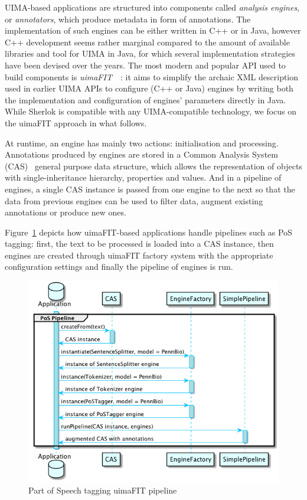\documentclass{article}
\begin{document}
UIMA-based applications are structured into components called \emph{analysis engines}, or
\emph{annotators}, which produce metadata in form of annotations. The implementation of such engines
can be either written in C++ or in Java, however C++ development seems rather marginal compared to
the amount of available libraries and tool for UIMA in Java, for which several implementation
strategies have been devised over the years. The most modern and popular API used to build
components is \emph{uimaFIT}~\cite{uimafit}~\cite{uimafit_2009}: it aims to simplify the archaic XML
description used in earlier UIMA APIs to configure (C++ or Java) engines by writing both the
implementation and configuration of engines' parameters directly in Java. While Sherlok is
compatible with any UIMA-compatible technology, we focus on the uimaFIT approach in what follows.

At runtime, an engine has mainly two actions: initialisation and processing. Annotations produced by
engines are stored in a Common Analysis System (CAS)~\cite{cas} general purpose data structure,
which allows the representation of objects with single-inheritance hierarchy, properties and values.
And in a pipeline of engines, a single CAS instance is passed from one engine to the next so that
the data from previous engines can be used to filter data, augment existing annotations or produce
new ones.

Figure~\ref{fig:pos_pipeline_uimafit} depicts how uimaFIT-based applications handle pipelines such
as PoS tagging: first, the text to be processed is loaded into a CAS instance, then engines are
created through uimaFIT factory system with the appropriate configuration settings and finally the
pipeline of engines is run.

\begin{figure}[h]
    \centering
    \includegraphics[width=0.9\linewidth]{res/uimafit.png}
    \caption{Part of Speech tagging uimaFIT pipeline}
    \label{fig:pos_pipeline_uimafit}
\end{figure}
\end{document}
